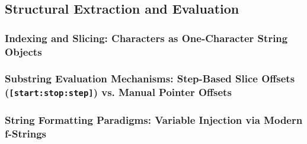 \subsection{Structural Extraction and Evaluation}
\subsubsection{Indexing and Slicing: Characters as One-Character String Objects}
\subsubsection{Substring Evaluation Mechanisms: Step-Based Slice Offsets (\texttt{[start:stop:step]}) vs. Manual Pointer Offsets}
\subsubsection{String Formatting Paradigms: Variable Injection via Modern f-Strings}
